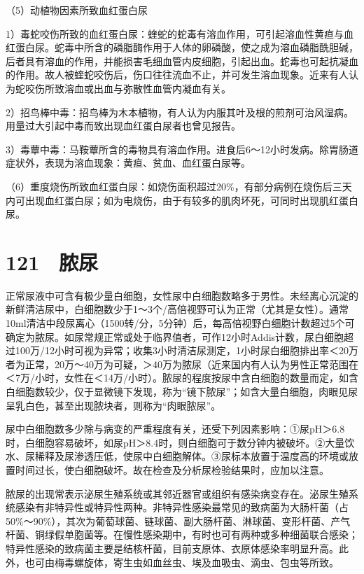（5）动植物因素所致血红蛋白尿

1）毒蛇咬伤所致的血红蛋白尿：蝰蛇的蛇毒有溶血作用，可引起溶血性黄疸与血红蛋白尿。蛇毒中所含的磷脂酶作用于人体的卵磷酸，使之成为溶血磷脂酰胆碱，后者具有溶血的作用，并能损害毛细血管内皮细胞，引起出血。蛇毒也可起抗凝血的作用。故人被蝰蛇咬伤后，伤口往往流血不止，并可发生溶血现象。近来有人认为蛇咬伤所致溶血或出血与弥散性血管内凝血有关。

2）招鸟棒中毒：招鸟棒为木本植物，有人认为内服其叶及根的煎剂可治风湿病。用量过大引起中毒而致出现血红蛋白尿者也曾见报告。

3）毒蕈中毒：马鞍蕈所含的毒物具有溶血作用。进食后6～12小时发病。除胃肠道症状外，表现为溶血现象：黄疸、贫血、血红蛋白尿等。

（6）重度烧伤所致血红蛋白尿：如烧伤面积超过20\%，有部分病例在烧伤后三天内可出现血红蛋白尿；如为电烧伤，由于有较多的肌肉坏死，可同时出现肌红蛋白尿。

\protect\hypertarget{text00282.html}{}{}

\section{121　脓尿}

正常尿液中可含有极少量白细胞，女性尿中白细胞数略多于男性。未经离心沉淀的新鲜清洁尿中，白细胞数少于1～3个/高倍视野可认为正常（尤其是女性）。通常10ml清洁中段尿离心（1500转/分，5分钟）后，每高倍视野白细胞计数超过5个可确定为脓尿。如尿常规正常或处于临界值者，可作12小时Addis计数，尿白细胞超过100万/12小时可视为异常；收集3小时清洁尿测定，1小时尿白细胞排出率＜20万者为正常，20万～40万为可疑，＞40万为脓尿（近来国内有人认为男性正常范围在＜7万/小时，女性在＜14万/小时）。脓尿的程度按尿中含白细胞的数量而定，如含白细胞数较少，仅于显微镜下发现，称为“镜下脓尿”；如含大量白细胞，肉眼见尿呈乳白色，甚至出现脓块者，则称为“肉眼脓尿”。

尿中白细胞数多少除与病变的严重程度有关，还受下列因素影响：①尿pH＞6.8时，白细胞容易破坏，如尿pH＞8.4时，则白细胞可于数分钟内被破坏。②大量饮水、尿稀释及尿渗透压低，使尿中白细胞解体。③尿标本放置于温度高的环境或放置时间过长，使白细胞破坏。故在检查及分析尿检验结果时，应加以注意。

脓尿的出现常表示泌尿生殖系统或其邻近器官或组织有感染病变存在。泌尿生殖系统感染有非特异性或特异性两种。非特异性感染最常见的致病菌为大肠杆菌（占50\%～90\%），其次为葡萄球菌、链球菌、副大肠杆菌、淋球菌、变形杆菌、产气杆菌、铜绿假单胞菌等。在慢性感染期中，有时也可有两种或多种细菌联合感染；特异性感染的致病菌主要是结核杆菌，目前支原体、衣原体感染率明显升高。此外，也可由梅毒螺旋体，寄生虫如血丝虫、埃及血吸虫、滴虫、包虫等所致。

